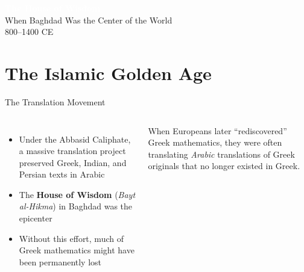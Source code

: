 
{
\begin{frame}[plain]
  \centering
  \vfill
  \textcolor{white}{\Huge\bfseries The House of Wisdom}\\[0.7em]
  \textcolor{white!85}{\Large When Baghdad Was the Center of the World}\\[1.5em]
  \textcolor{white!65}{\large 800--1400 CE}
  \vfill
  \vfill
\end{frame}
}

\section{The Islamic Golden Age}

\begin{frame}[shrink=3]{The Translation Movement}
  \begin{columns}[T]
    \begin{itemize}
      \item Under the Abbasid Caliphate, a massive translation project preserved Greek, Indian, and Persian texts in Arabic
      \item The \textbf{House of Wisdom} (\textit{Bayt al-Hikma}) in Baghdad was the epicenter
      \item Without this effort, much of Greek mathematics might have been permanently lost
    \end{itemize}
    \vspace{0.5em}
    \begin{insightbox}
      When Europeans later ``rediscovered'' Greek mathematics, they were often translating \emph{Arabic} translations of Greek originals that no longer existed in Greek.
    \end{insightbox}

  \end{columns}

\end{frame}

